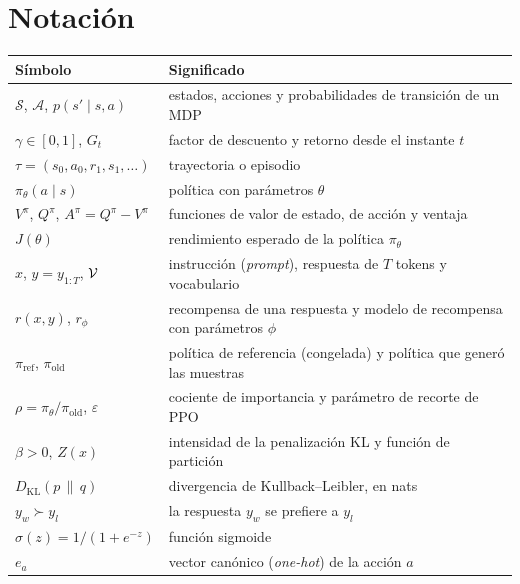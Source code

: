 \documentclass[11pt,a4paper,twoside,openany]{book}
\newcommand{\Sset}{\mathcal{S}}
\newcommand{\Aset}{\mathcal{A}}
\newcommand{\KL}{D_{\mathrm{KL}}}
\newcommand{\piref}{\pi_{\mathrm{ref}}}
\newcommand{\piold}{\pi_{\mathrm{old}}}
\newcommand{\pref}{\succ}
\begin{document}
\section*{Notación}
\begin{center}\small
\begin{tabularx}{\textwidth}{@{}l>{\raggedright\arraybackslash}X@{}}
\toprule
Símbolo & Significado \\
\midrule
$\Sset$, $\Aset$, $p(s'\mid s,a)$ & estados, acciones y probabilidades de transición de un MDP \\
$\gamma\in[0,1]$, $G_t$ & factor de descuento y retorno desde el instante $t$ \\
$\tau=(s_0,a_0,r_1,s_1,\dots)$ & trayectoria o episodio \\
$\pi_\theta(a\mid s)$ & política con parámetros $\theta$ \\
$V^{\pi}$, $Q^{\pi}$, $A^{\pi}=Q^{\pi}-V^{\pi}$ & funciones de valor de estado, de acción y ventaja \\
$J(\theta)$ & rendimiento esperado de la política $\pi_\theta$ \\
$x$, $y=y_{1:T}$, $\mathcal{V}$ & instrucción (\emph{prompt}), respuesta de $T$ tokens y vocabulario \\
$r(x,y)$, $r_\phi$ & recompensa de una respuesta y modelo de recompensa con parámetros $\phi$ \\
$\piref$, $\piold$ & política de referencia (congelada) y política que generó las muestras \\
$\rho=\pi_\theta/\piold$, $\varepsilon$ & cociente de importancia y parámetro de recorte de PPO \\
$\beta>0$, $Z(x)$ & intensidad de la penalización KL y función de partición \\
$\KL(p\,\|\,q)$ & divergencia de Kullback--Leibler, en nats \\
$y_w\pref y_l$ & la respuesta $y_w$ se prefiere a $y_l$ \\
$\sigma(z)=1/(1+e^{-z})$ & función sigmoide \\
$e_a$ & vector canónico (\emph{one-hot}) de la acción $a$ \\
\bottomrule
\end{tabularx}
\end{center}

\tableofcontents

\mainmatter







\appendix


\backmatter

\end{document}
